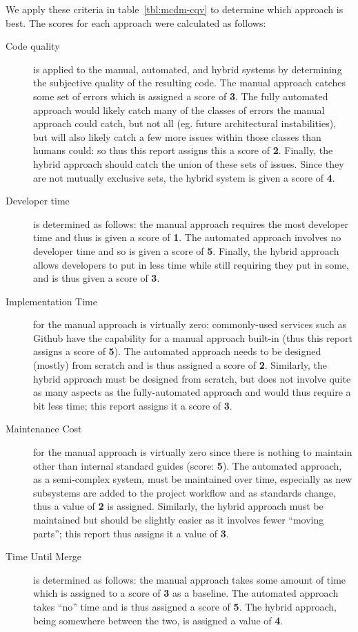 \documentclass[12pt]{article}
\begin{document}
We apply these criteria in table~\ref{tbl:mcdm-cqv} to determine which approach is best. The scores for each approach were calculated as follows:
\begin{description}
\item[Code quality] is applied to the manual, automated, and hybrid systems by determining the subjective quality of the resulting code. The manual approach catches some set of errors which is assigned a score of {\bf 3}. The fully automated approach would likely catch many of the classes of errors the manual approach could catch, but not all (eg. future architectural instabilities), but will also likely catch a few more issues within those classes than humans could: so thus this report assigns this a score of {\bf 2}. Finally, the hybrid approach should catch the union of these sets of issues. Since they are not mutually exclusive sets, the hybrid system is given a score of {\bf 4}.
\item[Developer time] is determined as follows: the manual approach requires the most developer time and thus is given a score of {\bf 1}. The automated approach involves no developer time and so is given a score of {\bf 5}. Finally, the hybrid approach allows developers to put in less time while still requiring they put in some, and is thus given a score of {\bf 3}.
\item[Implementation Time] for the manual approach is virtually zero: commonly-used services such as Github have the capability for a manual approach built-in (thus this report assigns a score of {\bf 5}). The automated approach needs to be designed (mostly) from scratch and is thus assigned a score of {\bf 2}. Similarly, the hybrid approach must be designed from scratch, but does not involve quite as many aspects as the fully-automated approach and would thus require a bit less time; this report assigns it a score of {\bf 3}.
\item[Maintenance Cost] for the manual approach is virtually zero since there is nothing to maintain other than internal standard guides (score: {\bf 5}). The automated approach, as a semi-complex system, must be maintained over time, especially as new subsystems are added to the project workflow and as standards change, thus a value of {\bf 2} is assigned. Similarly, the hybrid approach must be maintained but should be slightly easier as it involves fewer ``moving parts''; this report thus assigns it a value of {\bf 3}.
\item[Time Until Merge] is determined as follows: the manual approach takes some amount of time which is assigned to a score of {\bf 3} as a baseline. The automated approach takes ``no'' time and is thus assigned a score of {\bf 5}. The hybrid approach, being somewhere between the two, is assigned a value of {\bf 4}.
\end{description}
\end{document}
